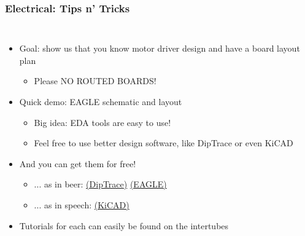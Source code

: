 \documentclass{beamer}
\begin{document}
\begin{frame}
\frametitle{Electrical: Tips n' Tricks}
\begin{columns}[t]
\begin{itemize}
  \item Goal: show us that you know motor driver design and have a board layout plan
  \begin{itemize}
    \item Please NO ROUTED BOARDS!
  \end{itemize}
  \item Quick demo: EAGLE schematic and layout
  \begin{itemize}
    \item Big idea: EDA tools are easy to use!
    \item Feel free to use better design software, like DipTrace or even KiCAD
  \end{itemize}
  \item And you can get them for free!
  \begin{itemize}
    \item ... as in beer: {\tiny
    \href{http://diptrace.com/}{(DipTrace)}
    \href{http://www.cadsoftusa.com/}{(EAGLE)}
    }
    \item ... as in speech: {\tiny
    \href{http://www.kicad-pcb.org/}{(KiCAD)}
    }
  \end{itemize}
  \item Tutorials for each can easily be found on the intertubes
\end{itemize}


\end{columns}
\end{frame}
\end{document}
